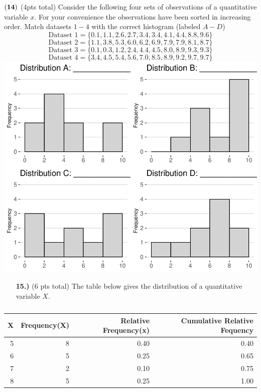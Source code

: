 \documentclass[
]{article}
\begin{document}
\({\bf (14)}\) (4pts total) Consider the following four sets of
observations of a quantitative variable \(x\). For your convenience the
observations have been sorted in increasing order. Match datasets
\(1-4\) with the correct histogram (labeled \(A - D\))
\[\text{Dataset 1} = \{0.1, 1.1, 2.6, 2.7, 3.4, 3.4, 4.1, 4.4, 8.8, 9.6\}\]
\[\text{Dataset 2} = \{1.1, 3.8, 5.3, 6.0, 6.2, 6.9, 7.9, 7.9, 8.1, 8.7\}\]
\[\text{Dataset 3}= \{0.1, 0.3, 1.2, 2.4, 4.4, 4.5, 8.0, 8.9, 9.3, 9.3\}\]
\[\text{Dataset 4} = \{3.4, 4.5, 5.4, 5.6, 7.0, 8.5, 8.9, 9.2, 9.7, 9.7\}\]
\includegraphics{Exam_1_Version_B_files/figure-latex/unnamed-chunk-6-1.pdf}

\newpage
\begin{enumerate}
\item[\bf 15.)] (6 pts total) The table below gives the distribution of a quantitative variable $X$.
\end{enumerate}

\begin{table}[H]

\caption{\label{tab:unnamed-chunk-7}}
\centering
\begin{tabular}[t]{rrrr}
\toprule
X & Frequency(X) & Relative Frequency(x) & Cumulative Relative Fequency\\
\midrule
5 & 8 & 0.40 & 0.40\\
6 & 5 & 0.25 & 0.65\\
7 & 2 & 0.10 & 0.75\\
8 & 5 & 0.25 & 1.00\\
\bottomrule
\end{tabular}
\end{table}
\end{document}
